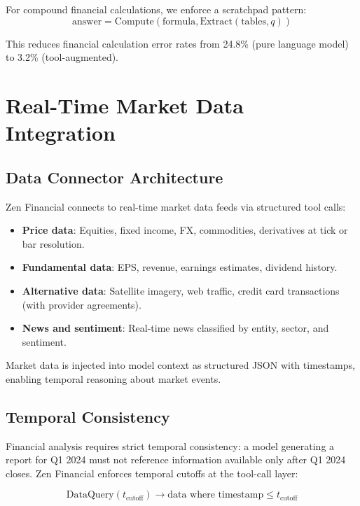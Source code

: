 \documentclass[11pt,a4paper]{article}
\begin{document}
For compound financial calculations, we enforce a scratchpad pattern:
\begin{equation}
\text{answer} = \text{Compute}\!\left(\text{formula}, \text{Extract}(\text{tables}, q)\right)
\end{equation}

This reduces financial calculation error rates from 24.8\% (pure language model) to 3.2\% (tool-augmented).

\section{Real-Time Market Data Integration}

\subsection{Data Connector Architecture}

Zen Financial connects to real-time market data feeds via structured tool calls:

\begin{itemize}
  \item \textbf{Price data}: Equities, fixed income, FX, commodities, derivatives at tick or bar resolution.
  \item \textbf{Fundamental data}: EPS, revenue, earnings estimates, dividend history.
  \item \textbf{Alternative data}: Satellite imagery, web traffic, credit card transactions (with provider agreements).
  \item \textbf{News and sentiment}: Real-time news classified by entity, sector, and sentiment.
\end{itemize}

Market data is injected into model context as structured JSON with timestamps, enabling temporal reasoning about market events.

\subsection{Temporal Consistency}

Financial analysis requires strict temporal consistency: a model generating a report for Q1 2024 must not reference information available only after Q1 2024 closes. Zen Financial enforces temporal cutoffs at the tool-call layer:

\begin{equation}
\text{DataQuery}(t_{\text{cutoff}}) \to \text{data where } \text{timestamp} \leq t_{\text{cutoff}}
\end{equation}
\end{document}
